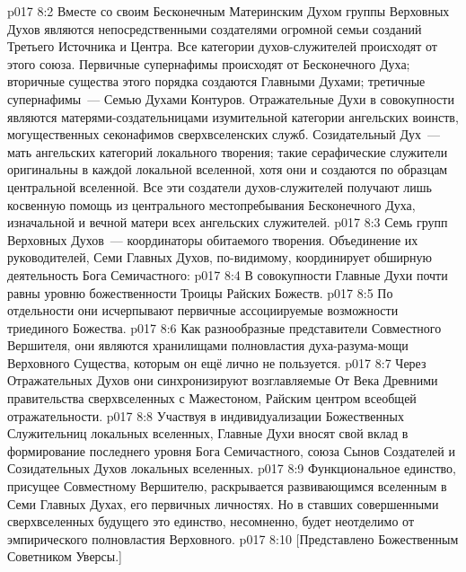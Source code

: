\vs p017 8:2 \pc Вместе со своим Бесконечным Материнским Духом группы Верховных Духов являются непосредственными создателями огромной семьи созданий Третьего Источника и Центра. Все категории духов\hyp{}служителей происходят от этого союза. Первичные супернафимы происходят от Бесконечного Духа; вторичные существа этого порядка создаются Главными Духами; третичные супернафимы~--- Семью Духами Контуров. Отражательные Духи в совокупности являются матерями\hyp{}создательницами изумительной категории ангельских воинств, могущественных секонафимов сверхвселенских служб. Созидательный Дух~--- мать ангельских категорий локального творения; такие серафические служители оригинальны в каждой локальной вселенной, хотя они и создаются по образцам центральной вселенной. Все эти создатели духов\hyp{}служителей получают лишь косвенную помощь из центрального местопребывания Бесконечного Духа, изначальной и вечной матери всех ангельских служителей.
\vs p017 8:3 \pc Семь групп Верховных Духов~--- координаторы обитаемого творения. Объединение их руководителей, Семи Главных Духов, по\hyp{}видимому, координирует обширную деятельность Бога Семичастного:
\vs p017 8:4 В совокупности Главные Духи почти равны уровню божественности Троицы Райских Божеств.
\vs p017 8:5 По отдельности они исчерпывают первичные ассоциируемые возможности триединого Божества.
\vs p017 8:6 Как разнообразные представители Совместного Вершителя, они являются хранилищами полновластия духа\hyp{}разума\hyp{}мощи Верховного Существа, которым он ещё лично не пользуется.
\vs p017 8:7 Через Отражательных Духов они синхронизируют возглавляемые От Века Древними правительства сверхвселенных с Мажестоном, Райским центром всеобщей отражательности.
\vs p017 8:8 Участвуя в индивидуализации Божественных Служительниц локальных вселенных, Главные Духи вносят свой вклад в формирование последнего уровня Бога Семичастного, союза Сынов Создателей и Созидательных Духов локальных вселенных.
\vs p017 8:9 \pc Функциональное единство, присущее Совместному Вершителю, раскрывается развивающимся вселенным в Семи Главных Духах, его первичных личностях. Но в ставших совершенными сверхвселенных будущего это единство, несомненно, будет неотделимо от эмпирического полновластия Верховного.
\vsetoff
\vs p017 8:10 [Представлено Божественным Советником Уверсы.]
\quizlink

